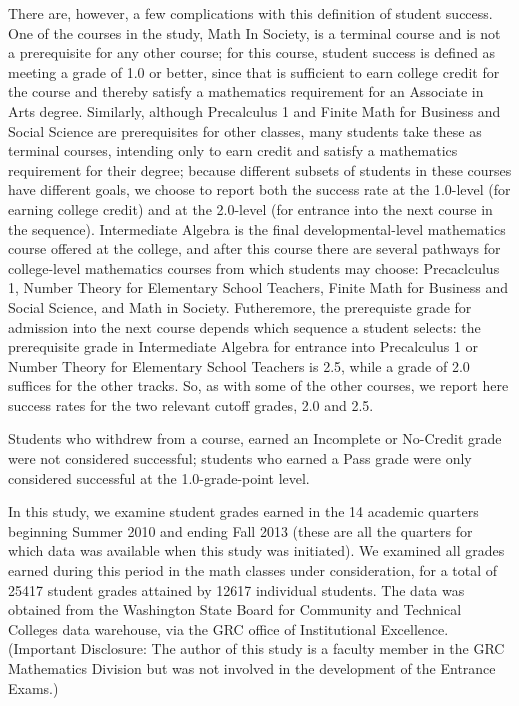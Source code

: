\documentclass[twoside]{article}\usepackage[]{graphicx}\usepackage[]{color}
\begin{document}
There are, however, a few complications with this definition of student success.  One of the courses in the study, Math In Society, is a terminal course and is not a prerequisite for any other course; for this course, student success is defined as meeting a grade of 1.0 or better, since that is sufficient to earn college credit for the course and thereby satisfy a mathematics requirement for an Associate in Arts degree.  Similarly, although Precalculus 1 and Finite Math for Business and Social Science are prerequisites for other classes, many students take these as terminal courses, intending only to earn credit and satisfy a mathematics requirement for their degree; because different subsets of students in these courses have different goals, we choose to report both the success rate at the 1.0-level (for earning college credit) and at the 2.0-level (for entrance into the next course in the sequence).  Intermediate Algebra is the final developmental-level mathematics course offered at the college, and after this course there are several pathways for college-level mathematics courses from which students may choose: Precaclculus 1, Number Theory for Elementary School Teachers, Finite Math for Business and Social Science, and Math in Society.   Futheremore, the prerequiste grade for admission into the next course depends which sequence a student selects: the prerequisite grade in Intermediate Algebra for entrance into Precalculus 1 or Number Theory for Elementary School Teachers is 2.5, while a grade of 2.0 suffices for the other tracks.  So, as with some of the other courses, we report here success rates for the two relevant cutoff grades, 2.0 and 2.5.

Students who withdrew from a course, earned an Incomplete or No-Credit grade were not considered successful; students who earned a Pass grade were only considered successful at the 1.0-grade-point level.

In this study, we examine student grades earned in the 14 academic quarters beginning Summer 2010 and ending Fall 2013 (these are all the quarters for which data was available when this study was initiated).  We examined all grades earned during this period in the math classes under consideration, for a total of 25417 student grades attained by 12617 individual students.  The data was obtained from the Washington State Board for Community and Technical Colleges data warehouse, via the GRC office of Institutional Excellence.  (Important Disclosure: The author of this study is a faculty member in the GRC Mathematics Division but was not involved in the development of the Entrance Exams.)
\end{document}
